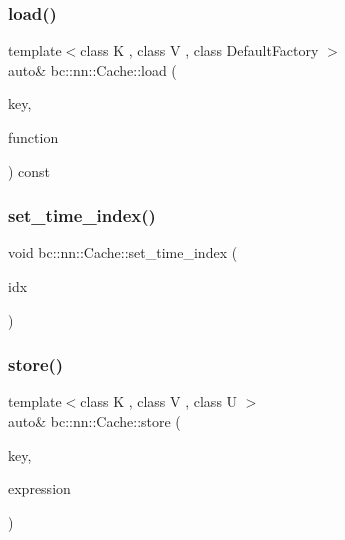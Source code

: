 \subsubsection{\texorpdfstring{load()}{load()}\hspace{0.1cm}{\footnotesize\ttfamily [8/8]}}
{\footnotesize\ttfamily template$<$class K , class V , class Default\+Factory $>$ \\
auto\& bc\+::nn\+::\+Cache\+::load (\begin{DoxyParamCaption}\item[{\hyperlink{structbc_1_1nn_1_1Cache_aedd77c5710dcb5f9edd8ecb3c3041048}{key\+\_\+type}$<$ K, V, cache\+\_\+key\+\_\+type\+::always\+\_\+forward $>$}]{key,  }\item[{Default\+Factory}]{function }\end{DoxyParamCaption}) const\hspace{0.3cm}{\ttfamily [inline]}}

\mbox{\label{structbc_1_1nn_1_1Cache_a696ba8a7e1c35c243d37cce7e87aed58}} 
\subsubsection{\texorpdfstring{set\+\_\+time\+\_\+index()}{set\_time\_index()}}
{\footnotesize\ttfamily void bc\+::nn\+::\+Cache\+::set\+\_\+time\+\_\+index (\begin{DoxyParamCaption}\item[{int}]{idx }\end{DoxyParamCaption})\hspace{0.3cm}{\ttfamily [inline]}}

\mbox{\label{structbc_1_1nn_1_1Cache_a69df8779e44138168af98b688af9c0d1}} 
\subsubsection{\texorpdfstring{store()}{store()}\hspace{0.1cm}{\footnotesize\ttfamily [1/3]}}
{\footnotesize\ttfamily template$<$class K , class V , class U $>$ \\
auto\& bc\+::nn\+::\+Cache\+::store (\begin{DoxyParamCaption}\item[{\hyperlink{structbc_1_1nn_1_1Cache_aedd77c5710dcb5f9edd8ecb3c3041048}{key\+\_\+type}$<$ K, V, cache\+\_\+key\+\_\+type\+::inherit $>$}]{key,  }\item[{U \&\&}]{expression }\end{DoxyParamCaption})\hspace{0.3cm}{\ttfamily [inline]}}

